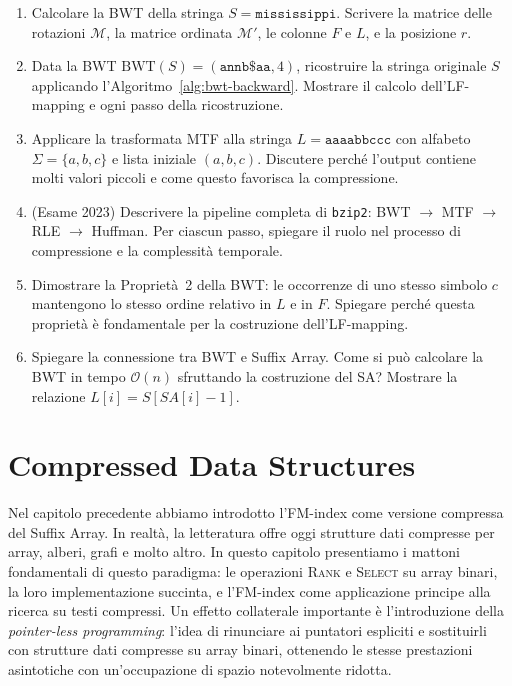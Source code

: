 \documentclass[12pt, a4paper, oneside]{book}
\theoremstyle{plain}
\theoremstyle{definition}
\theoremstyle{remark}
\newcommand{\OO}[1]{\mathcal{O}\!\left(#1\right)}
\newcommand{\bwt}{\mathrm{BWT}}
\begin{document}
\begin{enumerate}
  \item Calcolare la BWT della stringa $S = \texttt{mississippi}$. Scrivere la matrice delle rotazioni $\mathcal{M}$, la matrice ordinata $\mathcal{M}'$, le colonne $F$ e $L$, e la posizione $r$.

  \item Data la BWT $\bwt(S) = (\texttt{annb\$aa}, 4)$, ricostruire la stringa originale $S$ applicando l'Algoritmo~\ref{alg:bwt-backward}. Mostrare il calcolo dell'LF-mapping e ogni passo della ricostruzione.

  \item Applicare la trasformata MTF alla stringa $L = \texttt{aaaabbccc}$ con alfabeto $\Sigma = \{a, b, c\}$ e lista iniziale $(a, b, c)$. Discutere perché l'output contiene molti valori piccoli e come questo favorisca la compressione.

  \item (Esame 2023) Descrivere la pipeline completa di \texttt{bzip2}: BWT $\to$ MTF $\to$ RLE $\to$ Huffman. Per ciascun passo, spiegare il ruolo nel processo di compressione e la complessità temporale.

  \item Dimostrare la Proprietà~2 della BWT: le occorrenze di uno stesso simbolo $c$ mantengono lo stesso ordine relativo in $L$ e in $F$. Spiegare perché questa proprietà è fondamentale per la costruzione dell'LF-mapping.

  \item Spiegare la connessione tra BWT e Suffix Array. Come si può calcolare la BWT in tempo $\OO{n}$ sfruttando la costruzione del SA? Mostrare la relazione $L[i] = S[SA[i] - 1]$.
\end{enumerate}


\chapter{Compressed Data Structures}
\label{ch:compressed-ds}

Nel capitolo precedente abbiamo introdotto l'FM-index come versione compressa del Suffix Array. In realtà, la letteratura offre oggi strutture dati compresse per array, alberi, grafi e molto altro. In questo capitolo presentiamo i mattoni fondamentali di questo paradigma: le operazioni \textsc{Rank} e \textsc{Select} su array binari, la loro implementazione succinta, e l'FM-index come applicazione principe alla ricerca su testi compressi. Un effetto collaterale importante è l'introduzione della \emph{pointer-less programming}: l'idea di rinunciare ai puntatori espliciti e sostituirli con strutture dati compresse su array binari, ottenendo le stesse prestazioni asintotiche con un'occupazione di spazio notevolmente ridotta.
\end{document}
